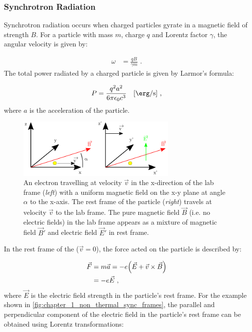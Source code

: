\subsubsection{Synchrotron Radiation}

Synchrotron radiation occurs when charged particles gyrate in a magnetic field of strength $B$. For a particle with mass $m$, charge $q$ and Lorentz factor $\gamma$, the angular velocity is given by:

\begin{equation}
    \begin{aligned}
    	\omega &=\frac{qB}{\gamma m}\text{ .}
    \end{aligned}
\end{equation}
\noindent The total power radiated by a charged particle is given by Larmor's formula:

\begin{equation}
    \begin{aligned}
    P=\frac{q^2a^2}{6\pi\epsilon_0c^3}\quad\qty[\si{\ergs\per\second}]\text{ ,}
    \end{aligned}
\end{equation}
\noindent where $a$ is the acceleration of the particle.

\begin{figure}[b!]
	\centering
	\includegraphics[width=0.7\textwidth]{04_Introduction/Images/non_thermal_emission/synchrotron_frames.pdf}
	\caption {An electron travelling at velocity $\vec{v}$ in the x-direction of the lab frame (\textit{left}) with a uniform magnetic field on the x-y plane at angle $\alpha$ to the x-axis. The rest frame of the particle (\textit{right}) travels at velocity $\vec{v}$ to the lab frame. The pure magnetic field $\vec{B}$ (i.e. no electric fields) in the lab frame appears as a mixture of magnetic field $\vec{B}'$ and electric field $\vec{E}'$ in rest frame.}
	\label{fig:chapter_1_non_thermal_sync_frames}
\end{figure}
\newpar 
In the rest frame of the ($\vec{v}=0$), the force acted on the particle is described by:

\begin{equation}
	\begin{split}
		\vec{F}&=m\vec{a}=-e\qty(\vec{E}+\vec{v}\times \vec{B})  \\
		&=-e\vec{E}\text{ ,}
	\end{split}
\end{equation}
where $\vec{E}$ is the electric field strength in the particle's rest frame. For the example shown in \autoref{fig:chapter_1_non_thermal_sync_frames}, the parallel and perpendicular component of the electric field in the particle's rest frame can be obtained using Lorentz transformations:

